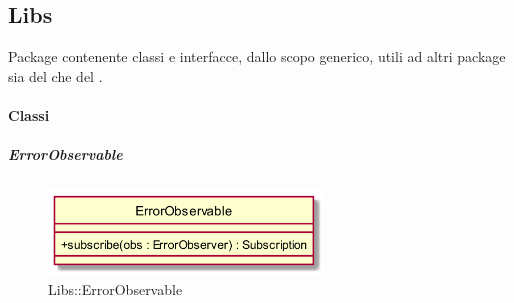 \subsection{\textbf{Libs}}
Package contenente classi e interfacce, dallo scopo generico, utili ad altri package sia del  che del .
\paragraph{Classi}
\hypertarget{ErrorObservable_label}{\subparagraph{ErrorObservable}}
\begin{figure}[h]
	\centering
	\includegraphics[width=0.65\textwidth,height=\textheight,keepaspectratio]{images/ClassErrorObservable.png}
	\caption{Libs::ErrorObservable}
\end{figure}
